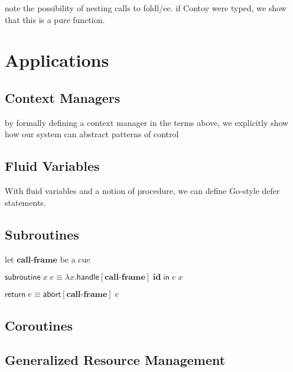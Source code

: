 \documentclass[11pt]{article}
\newcommand{\Cue}{\textbf{Cue}}
\newcommand{\handle}[3]{\textsf{handle}[#1]\;#2\;\textsf{in}\;#3}
\newcommand{\abort}[2]{\textsf{abort}[#1]\;#2}
\begin{document}
note the possibility of nesting calls to foldl/ee.
if Contoy were typed, we show that this is a pure function.

\section{Applications}
\label{application}
\subsection{Context Managers}

by formally defining a context manager in the terms above, we explicitly show how our system can abstract patterns of control


\subsection{Fluid Variables}
With fluid variables and a notion of procedure, we can define Go-style defer statements.

\subsection{Subroutines}

let $\textbf{call-frame}$ be a cue

$\textsf{subroutine}\;x\;e \equiv \lambda x.\handle{\textbf{call-frame}}{\textbf{id}}{e\;x}$

$\textsf{return}\;e \equiv \abort{\textbf{call-frame}}{e}$



\subsection{Coroutines}



\subsection{Generalized Resource Management}
\end{document}
